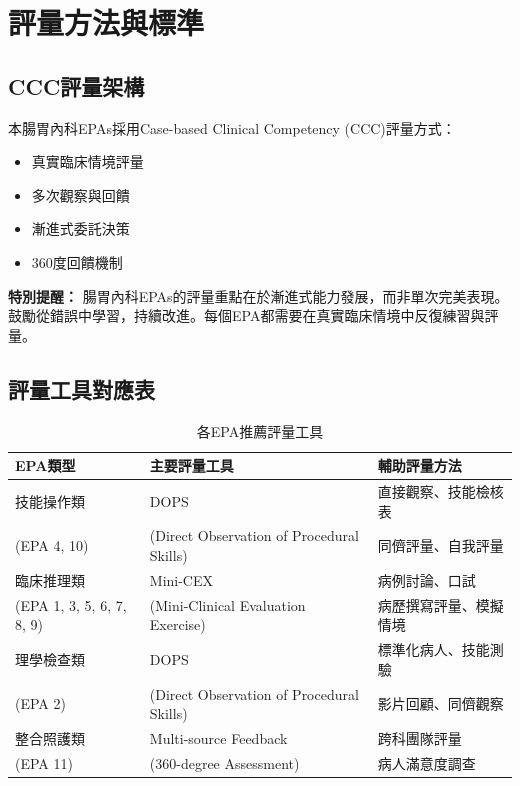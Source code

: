 \documentclass[12pt,a4paper]{article}
\begin{document}
\newpage
\section{評量方法與標準}

\subsection{CCC評量架構}
本腸胃內科EPAs採用Case-based Clinical Competency (CCC)評量方式：
\begin{itemize}[nosep]
    \item 真實臨床情境評量
    \item 多次觀察與回饋
    \item 漸進式委託決策
    \item 360度回饋機制
\end{itemize}

\begin{importantbox}
\textbf{特別提醒：} 腸胃內科EPAs的評量重點在於漸進式能力發展，而非單次完美表現。鼓勵從錯誤中學習，持續改進。每個EPA都需要在真實臨床情境中反復練習與評量。
\end{importantbox}

\subsection{評量工具對應表}
\begin{table}[h]
    \centering
    \caption{各EPA推薦評量工具}
    \begin{tabular}{p{4.5cm} p{4cm} p{5.5cm}}
        \toprule
        \textbf{EPA類型} & \textbf{主要評量工具} & \textbf{輔助評量方法} \\
        \midrule
        技能操作類 & DOPS & 直接觀察、技能檢核表 \\
        (EPA 4, 10) & (Direct Observation of Procedural Skills) & 同儕評量、自我評量 \\
        \midrule
        臨床推理類 & Mini-CEX & 病例討論、口試 \\
        (EPA 1, 3, 5, 6, 7, 8, 9) & (Mini-Clinical Evaluation Exercise) & 病歷撰寫評量、模擬情境 \\
        \midrule
        理學檢查類 & DOPS & 標準化病人、技能測驗 \\
        (EPA 2) & (Direct Observation of Procedural Skills) & 影片回顧、同儕觀察 \\
        \midrule
        整合照護類 & Multi-source Feedback & 跨科團隊評量 \\
        (EPA 11) & (360-degree Assessment) & 病人滿意度調查 \\
        \bottomrule
    \end{tabular}
\end{table}
\end{document}
